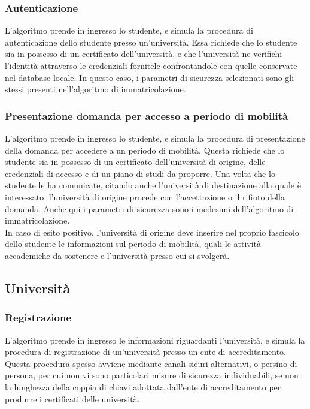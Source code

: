 \documentclass[a4paper,12pt]{article}
\begin{document}
\subsubsection{Autenticazione}
L'algoritmo prende in ingresso lo studente, e simula la procedura di autenticazione dello studente presso un'università. Essa richiede che lo studente sia in possesso di un certificato dell'università, e che l'università ne verifichi l'identità attraverso le credenziali fornitele confrontandole con quelle conservate nel database locale. In questo caso, i parametri di sicurezza selezionati sono gli stessi presenti nell'algoritmo di immatricolazione.
\subsubsection{Presentazione domanda per accesso a periodo di mobilità}
L'algoritmo prende in ingresso lo studente, e simula la procedura di presentazione della domanda per accedere a un periodo di mobilità. Questa richiede che lo studente sia in possesso di un certificato dell'università di origine, delle credenziali di accesso e di un piano di studi da proporre. Una volta che lo studente le ha comunicate, citando anche l'università di destinazione alla quale è interessato, l'università di origine procede con l'accettazione o il rifiuto della domanda. Anche qui i parametri di sicurezza sono i medesimi dell'algoritmo di immatricolazione.
\\[1em]
In caso di esito positivo, l'università di origine deve inserire nel proprio fascicolo dello studente le informazioni sul periodo di mobilità, quali le attività accademiche da sostenere e l'università presso cui si svolgerà.
\subsection{Università}
\subsubsection{Registrazione}
L'algoritmo prende in ingresso le informazioni riguardanti l'università, e simula la procedura di registrazione di un'università presso un ente di accreditamento. Questa procedura spesso avviene mediante canali sicuri alternativi, o persino di persona, per cui non vi sono particolari misure di sicurezza individuabili, se non la lunghezza della coppia di chiavi adottata dall'ente di accreditamento per produrre i certificati delle università.
\end{document}

